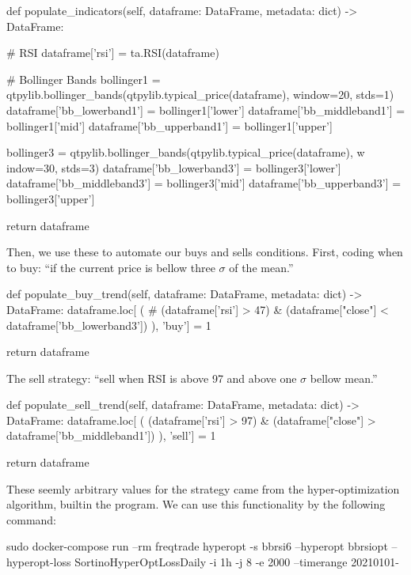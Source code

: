 \documentclass[
12pt,				%
openright,			%
oneside,			%
a4paper,			%
brazil,				%
english,			%
]{abntex2}
\begin{document}
\begin{python}
    def populate_indicators(self, dataframe: DataFrame, metadata: dict) -> DataFrame:

        # RSI
        dataframe['rsi'] = ta.RSI(dataframe)

        # Bollinger Bands
        bollinger1 = qtpylib.bollinger_bands(qtpylib.typical_price(dataframe), window=20, stds=1)
        dataframe['bb_lowerband1'] = bollinger1['lower']
        dataframe['bb_middleband1'] = bollinger1['mid']
        dataframe['bb_upperband1'] = bollinger1['upper']

        bollinger3 = qtpylib.bollinger_bands(qtpylib.typical_price(dataframe), w
indow=30, stds=3)
        dataframe['bb_lowerband3'] = bollinger3['lower']
        dataframe['bb_middleband3'] = bollinger3['mid']
        dataframe['bb_upperband3'] = bollinger3['upper']

        return dataframe
\end{python}

Then, we use these to automate our buys and sells conditions. First, coding when to buy: ``if the current price is bellow three $\sigma$ of the mean.'' 

\begin{python}
    def populate_buy_trend(self, dataframe: DataFrame, metadata: dict) -> DataFrame:
        dataframe.loc[
            (
                # (dataframe['rsi'] > 47) &
                (dataframe["close"] < dataframe['bb_lowerband3'])
            ),
            'buy'] = 1

        return dataframe
\end{python}

The sell strategy: ``sell when RSI is above 97 and above one $\sigma$ bellow mean.''

\begin{python}
    def populate_sell_trend(self, dataframe: DataFrame, metadata: dict) -> DataFrame:
        dataframe.loc[
            (
                (dataframe['rsi'] > 97) &
                (dataframe["close"] > dataframe['bb_middleband1'])
            ),
            'sell'] = 1

        return dataframe
\end{python}

These seemly arbitrary values for the strategy came from the hyper-optimization algorithm, builtin the program. We can use this functionality by the following command:

\begin{shell}
sudo docker-compose run --rm freqtrade hyperopt -s bbrsi6 --hyperopt bbrsiopt --hyperopt-loss SortinoHyperOptLossDaily -i 1h -j 8 -e 2000 --timerange 20210101-
\end{shell}
\end{document}
